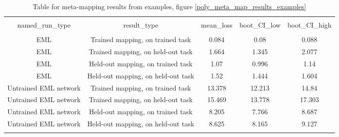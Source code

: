 \documentclass{article}
\begin{document}
\begin{table}[H]
\scriptsize
\centering
\begin{tabular}{@{\extracolsep{5pt}} ccccc} 
\\[-1.8ex]\hline 
\hline \\[-1.8ex] 
named\_run\_type & result\_type & mean\_loss & boot\_CI\_low & boot\_CI\_high \\ 
\hline \\[-1.8ex] 
EML & Trained mapping, on trained task & 0.084 & 0.08 & 0.088 \\ 
EML & Trained mapping, on held-out task & 1.664 & 1.345 & 2.077 \\ 
EML & Held-out mapping, on trained task & 1.07 & 0.996 & 1.14 \\ 
EML & Held-out mapping, on held-out task & 1.52 & 1.444 & 1.604 \\ 
Untrained EML network & Trained mapping, on trained task & 13.378 & 12.213 & 14.84 \\ 
Untrained EML network & Trained mapping, on held-out task & 15.469 & 13.778 & 17.303 \\ 
Untrained EML network & Held-out mapping, on trained task & 8.205 & 7.766 & 8.687 \\ 
Untrained EML network & Held-out mapping, on held-out task & 8.625 & 8.165 & 9.127 \\ 
\hline \\[-1.8ex] 
\end{tabular} 
\caption{Table for meta-mapping results from examples, figure \ref{poly_meta_map_results_examples}}
\end{table}
\end{document}

